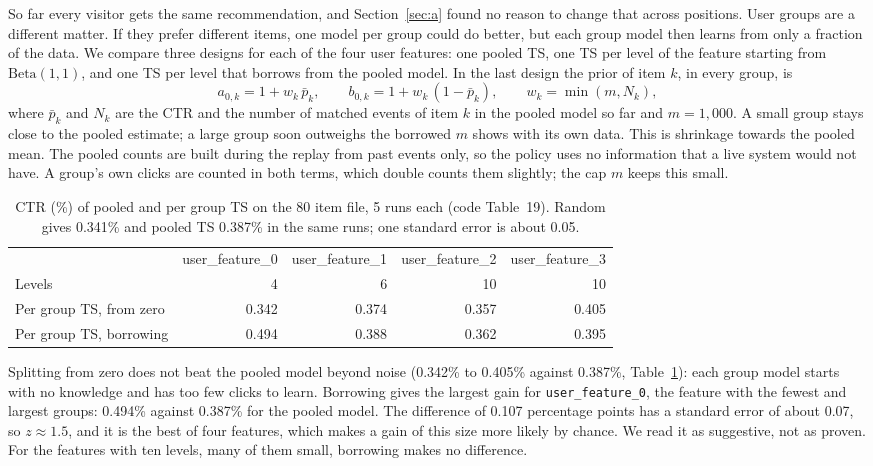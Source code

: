 \documentclass[11pt]{article}
\begin{document}
So far every visitor gets the same recommendation, and Section~\ref{sec:a}
found no reason to change that across positions. User groups are a different
matter. If they prefer different items, one model per group could do better,
but each group model then learns from only a fraction of the data. We compare three designs for each of
the four user features: one pooled TS, one TS per level of the feature
starting from $\text{Beta}(1,1)$, and one TS per level that borrows from the
pooled model. In the last design the prior of item $k$, in every group, is
%
\begin{equation}
  a_{0,k} = 1 + w_k\,\bar p_k, \qquad b_{0,k} = 1 + w_k\,(1-\bar p_k),
  \qquad w_k = \min(m, N_k),
  \label{eq:borrow}
\end{equation}
%
where $\bar p_k$ and $N_k$ are the CTR and the number of matched events of
item $k$ in the pooled model so far and $m=1{,}000$. A small group stays close
to the pooled estimate; a large group soon outweighs the borrowed $m$ shows
with its own data. This is shrinkage towards the pooled mean. The pooled
counts are built during the replay from past events only, so the policy uses
no information that a live system would not have. A group's own clicks are
counted in both terms, which double counts them slightly; the cap $m$ keeps
this small.

\begin{table}[H]
  \centering
  \caption{CTR (\%) of pooled and per group TS on the 80 item file, 5 runs
    each (code Table~19). Random gives 0.341\% and pooled TS 0.387\% in the
    same runs; one standard error is about 0.05.}
  \label{tab:d}
  \small
  \begin{tabular}{lrrrr}
    \toprule
    & user\_feature\_0 & user\_feature\_1 & user\_feature\_2 & user\_feature\_3 \\
    Levels & 4 & 6 & 10 & 10 \\
    \midrule
    Per group TS, from zero    & 0.342 & 0.374 & 0.357 & 0.405 \\
    Per group TS, borrowing    & 0.494 & 0.388 & 0.362 & 0.395 \\
    \bottomrule
  \end{tabular}
\end{table}

Splitting from zero does not beat the pooled model beyond noise (0.342\% to
0.405\% against 0.387\%, Table~\ref{tab:d}): each group model starts with no
knowledge and has too few clicks to learn. Borrowing gives the largest gain
for \texttt{user\_feature\_0}, the feature with the fewest and largest groups:
0.494\% against 0.387\% for the pooled model. The difference of 0.107
percentage points has a standard error of about 0.07, so $z\approx1.5$, and
it is the best of four features, which makes a gain of this size more likely
by chance. We read it as suggestive, not as proven. For the features with
ten levels, many of them small, borrowing makes no difference.
\end{document}
